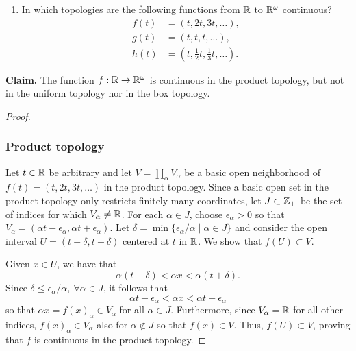 \begin{solution}
    \begin{enumerate}[label={(\alph*)}, align=left, leftmargin=\parindent, listparindent=\parindent, labelwidth=0pt, itemindent=!]
        \item In which topologies are the following functions from $\mathbb{R}$ to $\mathbb{R}^\omega$ continuous?
        \begin{align*}
            f(t) &= (t, 2t, 3t, \ldots), \\
            g(t) &= (t, t, t, \ldots), \\
            h(t) &= (t, \tfrac{1}{2} t, \tfrac{1}{3} t, \ldots).
        \end{align*}
    \end{enumerate}
    \textbf{Claim.} The function $f: \mathbb{R} \rightarrow \mathbb{R}^\omega$ is continuous in the product topology, but not in the uniform topology nor in the box topology.
    \begin{proof}~

        \subsubsection*{Product topology}
        Let $t \in \mathbb{R}$ be arbitrary and let $V = \prod_\alpha V_\alpha$ be a basic open neighborhood of $f(t) = (t, 2t, 3t, \ldots)$ in the product topology.
        Since a basic open set in the product topology only restricts finitely many coordinates, let $J \subset \mathbb{Z}_+$ be the set of indices for which $V_\alpha \neq \mathbb{R}$.
        For each $\alpha \in J$, choose $\epsilon_\alpha > 0$ so that $V_\alpha = (\alpha t - \epsilon_\alpha, \alpha t + \epsilon_\alpha)$.
        Let $\delta = \min\{\epsilon_\alpha / \alpha \mid \alpha \in J\}$ and consider the open interval $U = (t - \delta, t+ \delta)$ centered at $t$ in $\mathbb{R}$.
        We show that $f(U) \subset V$.

        Given $x \in U$, we have that
        \begin{equation*}
            \alpha (t - \delta) < \alpha x < \alpha (t + \delta).
        \end{equation*}
        Since $\delta \leq \epsilon_{\alpha} / \alpha,~ \forall \alpha \in J$, it follows that
        \begin{equation*}
            \alpha t - \epsilon_\alpha < \alpha x < \alpha t + \epsilon_\alpha
        \end{equation*}
        so that $\alpha x = f(x)_\alpha \in V_\alpha$ for all $\alpha \in J$.
        Furthermore, since $V_\alpha = \mathbb{R}$ for all other indices, $f(x)_\alpha \in V_\alpha$ also for $\alpha \notin J$ so that $f(x) \in V$.
        Thus, $f(U) \subset V$, proving that $f$ is continuous in the product topology.


\end{proof}
\end{solution}
